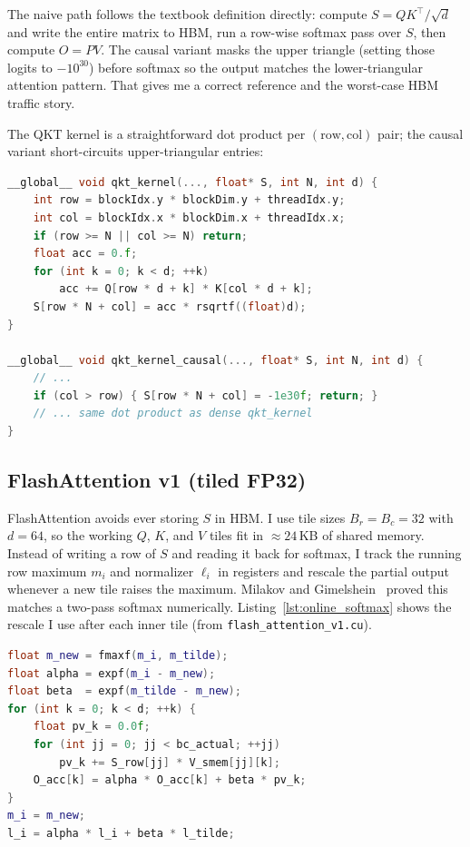 \documentclass[12pt]{article}
\begin{document}
The naive path follows the textbook definition directly: compute $S = QK^\top / \sqrt{d}$ and write the entire matrix to HBM, run a row-wise softmax pass over $S$, then compute $O = PV$. The causal variant masks the upper triangle (setting those logits to $-10^{30}$) before softmax so the output matches the lower-triangular attention pattern. That gives me a correct reference and the worst-case HBM traffic story.

\noindent The QKT kernel is a straightforward dot product per $(\text{row},\text{col})$ pair; the causal variant short-circuits upper-triangular entries:

\begin{lstlisting}[language=C++, basicstyle=\ttfamily\footnotesize, frame=single,
  commentstyle=\color{green!60!black}]
__global__ void qkt_kernel(..., float* S, int N, int d) {
    int row = blockIdx.y * blockDim.y + threadIdx.y;
    int col = blockIdx.x * blockDim.x + threadIdx.x;
    if (row >= N || col >= N) return;
    float acc = 0.f;
    for (int k = 0; k < d; ++k)
        acc += Q[row * d + k] * K[col * d + k];
    S[row * N + col] = acc * rsqrtf((float)d);
}

__global__ void qkt_kernel_causal(..., float* S, int N, int d) {
    // ...
    if (col > row) { S[row * N + col] = -1e30f; return; }
    // ... same dot product as dense qkt_kernel
}
\end{lstlisting}

\subsection{FlashAttention v1 (tiled FP32)}

FlashAttention avoids ever storing $S$ in HBM. I use tile sizes $B_r = B_c = 32$ with $d = 64$, so the working $Q$, $K$, and $V$ tiles fit in $\approx 24$\,KB of shared memory. Instead of writing a row of $S$ and reading it back for softmax, I track the running row maximum $m_i$ and normalizer $\ell_i$ in registers and rescale the partial output whenever a new tile raises the maximum. Milakov and Gimelshein~\cite{milakov2018} proved this matches a two-pass softmax numerically. Listing~\ref{lst:online_softmax} shows the rescale I use after each inner tile (from \texttt{flash\_attention\_v1.cu}).

\begin{lstlisting}[language=C++, basicstyle=\ttfamily\footnotesize, frame=single,
  caption={Online softmax rescale and partial $PV$ blend (FlashAttention v1).},
  label=lst:online_softmax, commentstyle=\color{green!60!black}]
float m_new = fmaxf(m_i, m_tilde);
float alpha = expf(m_i - m_new);
float beta  = expf(m_tilde - m_new);
for (int k = 0; k < d; ++k) {
    float pv_k = 0.0f;
    for (int jj = 0; jj < bc_actual; ++jj)
        pv_k += S_row[jj] * V_smem[jj][k];
    O_acc[k] = alpha * O_acc[k] + beta * pv_k;
}
m_i = m_new;
l_i = alpha * l_i + beta * l_tilde;
\end{lstlisting}
\end{document}
